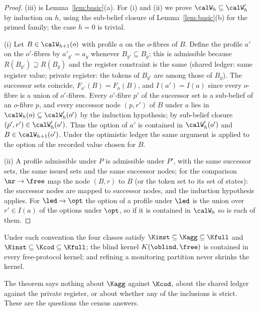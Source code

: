 \begin{proof}
(iii) is Lemma~\ref{lem:basic}(a). For (i) and (ii) we prove $\calW_h\subseteq\calW'_h$ by induction on $h$, using the sub-belief closure of Lemma~\ref{lem:basic}(b) for the primed family; the case $h=0$ is trivial.

(i) Let $B\in\calW_{h+1}(o)$ with profile $a$ on the $o$-fibres of $B$. Define the profile $a'$ on the $o'$-fibres by $a'_{y'}=a_y$ whenever $B_{y'}\subseteq B_y$; this is admissible because $R(B_{y'})\supseteq R(B_y)$ and the register constraint is the same (shared ledger: same register value; private register: the tokens of $B_{y'}$ are among those of $B_y$). The successor sets coincide, $F_{a'}(B)=F_a(B)$, and $I(a')=I(a)$ since every $o$-fibre is a union of $o'$-fibres. Every $o'$-fibre $p'$ of the successor set is a sub-belief of an $o$-fibre $p$, and every successor node $(p,r')$ of $B$ under $a$ lies in $\calW_h(o)\subseteq\calW'_h(o')$ by the induction hypothesis; by sub-belief closure $(p',r')\in\calW'_h(o')$. Thus the option of $a'$ is contained in $\calW'_h(o')$ and $B\in\calW_{h+1}(o')$. Under the optimistic ledger the same argument is applied to the option of the recorded value chosen for $B$.

(ii) A profile admissible under $P$ is admissible under $P'$, with the same successor sets, the same issued sets and the same successor nodes; for the comparison $\nr\to\free$ map the node $(B,r)$ to $B$ (or the token set to its set of states): the successor nodes are mapped to successor nodes, and the induction hypothesis applies. For $\led\to\opt$ the option of a profile under $\led$ is the union over $r'\in I(a)$ of the options under $\opt$, so if it is contained in $\calW_h$ so is each of them.
\end{proof}

\begin{corollary}\label{cor:order}
Under each convention the four classes satisfy $\Kinst\subseteq\Kagg\subseteq\Kfull$ and $\Kinst\subseteq\Kcod\subseteq\Kfull$; the blind kernel $K(\oblind,\free)$ is contained in every free-protocol kernel; and refining a monitoring partition never shrinks the kernel.
\end{corollary}

The theorem says nothing about $\Kagg$ against $\Kcod$, about the shared ledger against the private register, or about whether any of the inclusions is strict. These are the questions the census answers.


